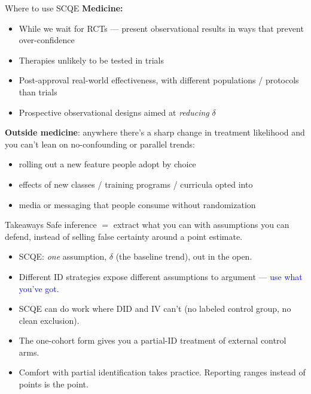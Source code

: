 \documentclass[xcolor=dvipsnames]{beamer}
\newcommand\makegaps{\addtolength{\itemsep}{.25\baselineskip}}
\begin{document}
\begin{frame}{Where to use SCQE}
\small
{} \textbf{Medicine:}
\begin{itemize}
\item While we wait for RCTs --- present observational results in ways that prevent over-confidence
\item Therapies unlikely to be tested in trials
\item Post-approval real-world effectiveness, with different populations / protocols than trials
\item Prospective observational designs aimed at \emph{reducing} $\delta$
\end{itemize}
\bigskip
{} \textbf{Outside medicine}: anywhere there's a sharp change in treatment likelihood and you can't lean on no-confounding or parallel trends:
\begin{itemize}
 \item rolling out a new feature people adopt by choice
 \item effects of new classes / training programs / curricula opted into
 \item media or messaging that people consume without randomization
 \end{itemize}
\end{frame}

\begin{frame}{Takeaways}
 Safe inference $=$ extract what you can with assumptions you can defend, instead of selling false certainty around a point estimate.\\
\bigskip
\small
\begin{itemize}\makegaps
\item<2-> SCQE: \emph{one} assumption, $\delta$ (the baseline trend), out in the open.
\item<3-> Different ID strategies expose different assumptions to argument --- \textcolor{blue}{use what you've got.}
\item<4-> SCQE can do work where DID and IV can't (no labeled control group, no clean exclusion).
\item<5-> The one-cohort form gives you a partial-ID treatment of external control arms.
\item<6-> Comfort with partial identification takes practice. Reporting ranges instead of points is the point.
\end{itemize}
\end{frame}

\appendix
\end{document}
